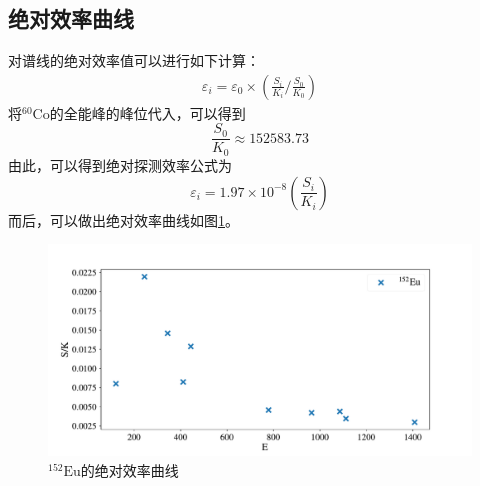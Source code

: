 \documentclass{article}
\begin{document}
\subsection{绝对效率曲线}
    对谱线的绝对效率值可以进行如下计算：
    \begin{equation}
        \begin{aligned}
            \varepsilon_i = \varepsilon_0\times(\frac{S_i}{K_i}/\frac{S_0}{K_0})
        \end{aligned}
    \end{equation}
    将$^{60}\text{Co}$的全能峰的峰位代入，可以得到
    \begin{equation}
        \frac{S_0}{K_0} \approx 152583.73
    \end{equation}
    由此，可以得到绝对探测效率公式为
    \begin{equation}
        \varepsilon_i = 1.97\times 10^{-8}(\frac{S_i}{K_i})
    \end{equation}
    而后，可以做出绝对效率曲线如图\ref{fig:Absolute}。
    \begin{figure}
        \centering
        \includegraphics[width=\textwidth]{../plots/Absolute.pdf}
        \caption{$^{152}\text{Eu}$的绝对效率曲线\label{fig:Absolute}}
    \end{figure}
\end{document}
